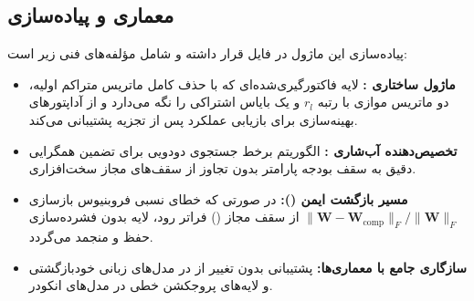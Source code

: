 \subsection{معماری و پیاده‌سازی}
پیاده‌سازی این ماژول در فایل  قرار داشته و شامل مؤلفه‌های فنی زیر است:
\begin{itemize}
    \item \textbf{ماژول ساختاری :} لایه فاکتورگیری‌شده‌ای که با حذف کامل ماتریس متراکم اولیه، دو ماتریس موازی با رتبه $r_l$ و یک بایاس اشتراکی را نگه می‌دارد و از آداپتورهای بهینه‌سازی  برای بازیابی عملکرد پس از تجزیه پشتیبانی می‌کند.
    \item \textbf{تخصیص‌دهنده آب‌شاری :} الگوریتم برخط جستجوی دودویی برای تضمین همگرایی دقیق به سقف بودجه پارامتر بدون تجاوز از سقف‌های مجاز سخت‌افزاری.
    \item \textbf{مسیر بازگشت ایمن ():} در صورتی که خطای نسبی فروبنیوس بازسازی $\|\mathbf{W} - \mathbf{W}_{\text{comp}}\|_F / \|\mathbf{W}\|_F$ از سقف مجاز () فراتر رود، لایه بدون فشرده‌سازی حفظ و منجمد می‌گردد.
    \item \textbf{سازگاری جامع با معماری‌ها:} پشتیبانی بدون تغییر از  در مدل‌های زبانی خودبازگشتی و لایه‌های پروجکشن خطی در مدل‌های انکودر.
\end{itemize}
